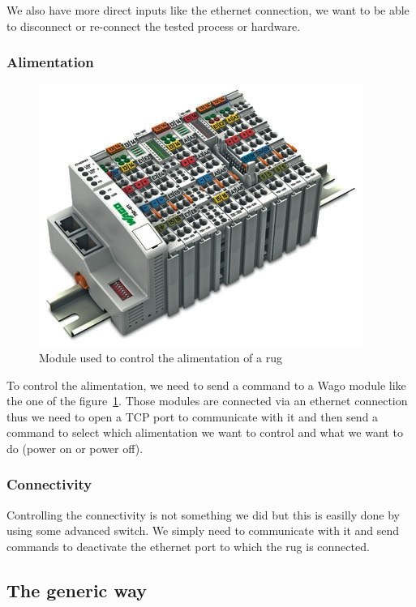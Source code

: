 \documentclass[12pt]{article}
\begin{document}
We also have more direct inputs like the ethernet connection, we want to be able to disconnect or re-connect the tested process or hardware.

\subsubsection{Alimentation}

\begin{figure}
    \centering
    \includegraphics[scale=0.6]{wago_module}
    \caption{Module used to control the alimentation of a \gls{rug}}
    \label{wago}
\end{figure}

To control the alimentation, we need to send a command to a Wago module like the one of the figure~\ref{wago}. Those modules are connected via an ethernet connection thus we need to open a TCP port to communicate with it and then send a command to select which alimentation we want to control and what we want to do (power on or power off).

\subsubsection{Connectivity}

Controlling the connectivity is not something we did but this is easilly done by using some advanced switch. We simply need to communicate with it and send commands to deactivate the ethernet port to which the \gls{rug} is connected.

\subsection{The generic way}
\end{document}

